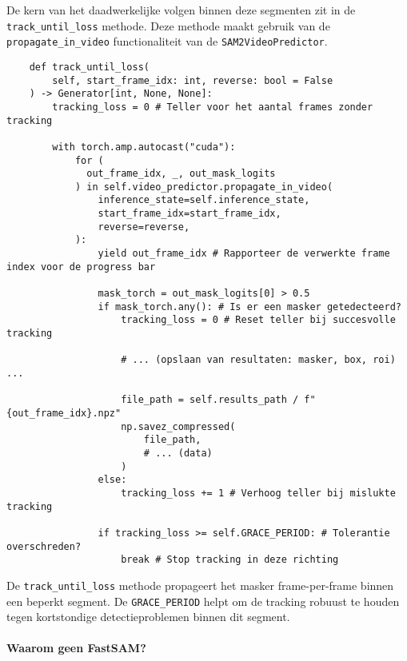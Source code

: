 De kern van het daadwerkelijke volgen binnen deze segmenten zit in de\\ \texttt{track\_until\_loss} methode. 
Deze methode maakt gebruik van de\\ \texttt{propagate\_in\_video} functionaliteit van de \texttt{SAM2VideoPredictor}.

\begin{listing}[H]
  \begin{verbatim}
    def track_until_loss(
        self, start_frame_idx: int, reverse: bool = False
    ) -> Generator[int, None, None]:
        tracking_loss = 0 # Teller voor het aantal frames zonder tracking

        with torch.amp.autocast("cuda"):
            for (
              out_frame_idx, _, out_mask_logits
            ) in self.video_predictor.propagate_in_video(
                inference_state=self.inference_state,
                start_frame_idx=start_frame_idx,
                reverse=reverse,
            ):
                yield out_frame_idx # Rapporteer de verwerkte frame index voor de progress bar

                mask_torch = out_mask_logits[0] > 0.5
                if mask_torch.any(): # Is er een masker getedecteerd?
                    tracking_loss = 0 # Reset teller bij succesvolle tracking

                    # ... (opslaan van resultaten: masker, box, roi) ...

                    file_path = self.results_path / f"{out_frame_idx}.npz"
                    np.savez_compressed(
                        file_path,
                        # ... (data)
                    )
                else:
                    tracking_loss += 1 # Verhoog teller bij mislukte tracking

                if tracking_loss >= self.GRACE_PERIOD: # Tolerantie overschreden?
                    break # Stop tracking in deze richting

  \end{verbatim}
  \caption[Gelokaliseerde tracking met tolerantieperiode]{
    De \texttt{track\_until\_loss} methode propageert het masker frame-per-frame binnen een beperkt segment. 
    De \texttt{GRACE\_PERIOD} helpt om de tracking robuust te houden tegen kortstondige detectieproblemen binnen dit segment.
  }
\end{listing}

\paragraph{Waarom geen FastSAM?}

